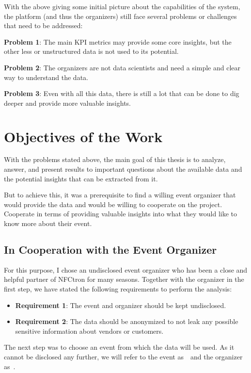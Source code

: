 With the above giving some initial picture about the capabilities of the system, the platform (and thus the organizers) still face several problems or challenges that need to be addressed:

\textbf{Problem 1}: The main KPI metrics may provide some core insights, but the other less or unstructured data is not used to its potential.

\textbf{Problem 2}: The organizers are not data scientists and need a simple and clear way to understand the data.

\textbf{Problem 3}: Even with all this data, there is still a lot that can be done to dig deeper and provide more valuable insights.

\section*{Objectives of the Work}
\label{sec:introduction-objectives}
With the problems stated above, the main goal of this thesis is to analyze, answer, and present results to important questions about the available data and the potential insights that can be extracted from it.

But to achieve this, it was a prerequisite to find a willing event organizer that would provide the data and would be willing to cooperate on the project.
Cooperate in terms of providing valuable insights into what they would like to know more about their event.

\subsection*{In Cooperation with the Event Organizer}
\label{subsec:introduction-objectives-cooperation}
For this purpose, I chose an undisclosed event organizer who has been a close and helpful partner of NFCtron for many seasons.
Together with the organizer in the first step, we have stated the following requirements to perform the analysis:
\begin{itemize}
	\item \textbf{Requirement 1}: The event and organizer should be kept undisclosed.
	\item \textbf{Requirement 2}: The data should be anonymized to not leak any possible sensitive information about vendors or customers.
\end{itemize}

The next step was to choose an event from which the data will be used.
As it cannot be disclosed any further, we will refer to the event as~\theEvent~and the organizer as~\theOrganizer.

